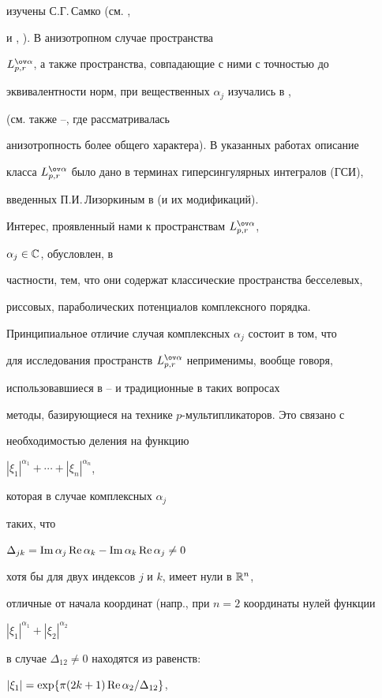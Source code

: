 изучены С.Г.\,Самко (см. \cite{6},


\cite{7} и \cite{8}, \cite{9}). В анизотропном случае пространства


$\spaceL$, а также пространства, совпадающие с ними с точностью до


эквивалентности норм, при вещественных $\alpha_j$ изучались в \cite{10},


\cite{11} (см. также \cite{12}--\cite{14}, где рассматривалась


анизотропность более общего характера). В указанных работах описание


класса $\spaceL$ было дано в терминах гиперсингулярных интегралов (ГСИ),


введенных П.И.\,Лизоркиным в \cite{3} (и их модификаций).





Интерес, проявленный нами к пространствам $\spaceL$,


$\alpha_j\in\Bbb C$, обусловлен, в


частности, тем, что они содержат классические пространства бесселевых,


риссовых, параболических потенциалов комплексного порядка.


Принципиальное отличие случая комплексных $\alpha_j$ состоит в том, что


для исследования пространств $\spaceL$ неприменимы, вообще говоря,


использовавшиеся в \cite{1}--\cite{11} и традиционные в таких вопросах


методы, базирующиеся на технике $p$-мультипликаторов. Это связано с


необходимостью деления на функцию


$|\xi_1|^{\alpha_1}+\dotsb+|\xi_n|^{\alpha_n}$,


которая в случае комплексных $\alpha_j$


таких, что


$\Delta_{jk}=\operatorname{Im}\alpha_j\operatorname{Re}\alpha_k-\operatorname{Im}\alpha_k\operatorname{Re}\alpha_j\ne 0$


хотя бы для двух индексов $j$ и $k$, имеет нули в $\Bbb R^n$,


отличные от начала координат (напр., при $n=2$ координаты нулей функции


$|\xi_1|^{\alpha_1}+|\xi_2|^{\alpha_2}$


в случае $\Delta_{12}\ne 0$ находятся из равенств:


$|\xi_1|=\exp\{\pi(2k+1)\operatorname{Re}\alpha_2/\Delta_{12}\}$,


